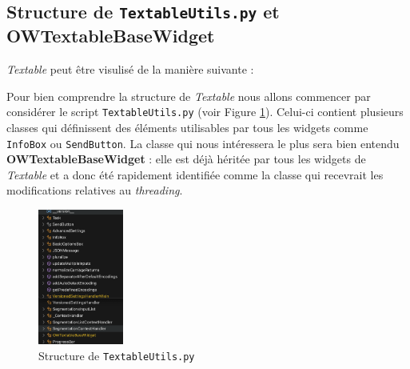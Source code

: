 \documentclass{article}
\begin{document}
\subsection{Structure de \texttt{TextableUtils.py} et \textbf{OWTextableBaseWidget}}

\textit{Textable} peut être visulisé de la manière suivante :
\vspace{5mm}

\vspace{5mm}

Pour bien comprendre la structure de \textit{Textable} nous allons commencer par considérer le script \texttt{TextableUtils.py} (voir Figure \ref{fig:textable_utils}). Celui-ci contient plusieurs classes qui définissent des éléments utilisables par tous les widgets comme \texttt{InfoBox} ou \texttt{SendButton}. La classe qui nous intéressera le plus sera bien entendu \textbf{OWTextableBaseWidget} : elle est déjà héritée par tous les widgets de \textit{Textable} et a donc été rapidement identifiée comme la classe qui recevrait les modifications relatives au \textit{threading}.

\vspace{5mm}

\begin{figure}[htbp]
    \centering
    \includegraphics[width=0.25\textwidth]{structure_utils.png}
    \caption{Structure de \texttt{TextableUtils.py}}
    \label{fig:textable_utils}
\end{figure}
\end{document}
